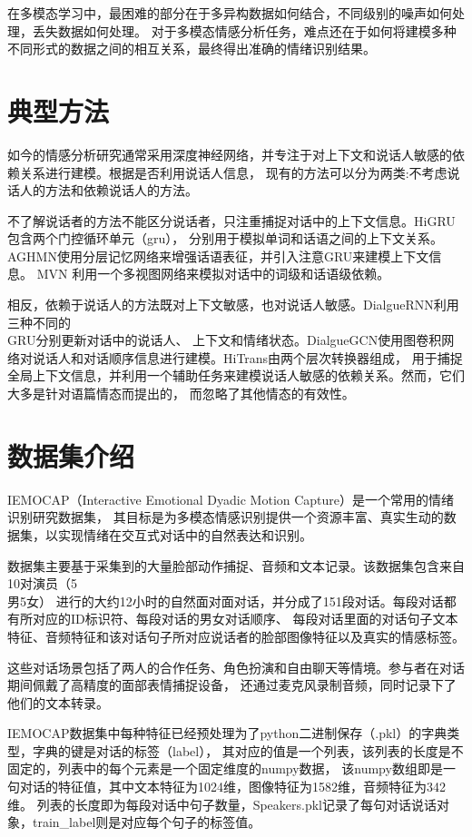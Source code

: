 \documentclass[11pt]{article}
\begin{document}
    在多模态学习中，最困难的部分在于多异构数据如何结合，不同级别的噪声如何处理，丢失数据如何处理。
    对于多模态情感分析任务，难点还在于如何将建模多种不同形式的数据之间的相互关系，最终得出准确的情绪识别结果。


    \section{典型方法}
    
    如今的情感分析研究通常采用深度神经网络，并专注于对上下文和说话人敏感的依赖关系进行建模。根据是否利用说话人信息，
    现有的方法可以分为两类:不考虑说话人的方法和依赖说话人的方法。

    不了解说话者的方法不能区分说话者，只注重捕捉对话中的上下文信息。HiGRU包含两个门控循环单元（gru），
    分别用于模拟单词和话语之间的上下文关系。AGHMN使用分层记忆网络来增强话语表征，并引入注意GRU来建模上下文信息。
    MVN 利用一个多视图网络来模拟对话中的词级和话语级依赖。
    
    相反，依赖于说话人的方法既对上下文敏感，也对说话人敏感。DialgueRNN利用三种不同的\\GRU分别更新对话中的说话人、
    上下文和情绪状态。DialgueGCN使用图卷积网络对说话人和对话顺序信息进行建模。HiTrans由两个层次转换器组成，
    用于捕捉全局上下文信息，并利用一个辅助任务来建模说话人敏感的依赖关系。然而，它们大多是针对语篇情态而提出的，
    而忽略了其他情态的有效性。
    
    
    \section{数据集介绍}

    IEMOCAP（Interactive Emotional Dyadic Motion Capture）是一个常用的情绪识别研究数据集，
    其目标是为多模态情感识别提供一个资源丰富、真实生动的数据集，以实现情绪在交互式对话中的自然表达和识别。

    数据集主要基于采集到的大量脸部动作捕捉、音频和文本记录。该数据集包含来自10对演员（5\\男5女）
    进行的大约12小时的自然面对面对话，并分成了151段对话。每段对话都有所对应的ID标识符、每段对话的男女对话顺序、
    每段对话里面的对话句子文本特征、音频特征和该对话句子所对应说话者的脸部图像特征以及真实的情感标签。

    这些对话场景包括了两人的合作任务、角色扮演和自由聊天等情境。参与者在对话期间佩戴了高精度的面部表情捕捉设备，
    还通过麦克风录制音频，同时记录下了他们的文本转录。

    IEMOCAP数据集中每种特征已经预处理为了python二进制保存（.pkl）的字典类型，字典的键是对话的标签（label），
    其对应的值是一个列表，该列表的长度是不固定的，列表中的每个元素是一个固定维度的numpy数据，
    该numpy数组即是一句对话的特征值，其中文本特征为1024维，图像特征为1582维，音频特征为342维。
    列表的长度即为每段对话中句子数量，Speakers.pkl记录了每句对话说话对象，train\_label则是对应每个句子的标签值。
    
\end{document}
